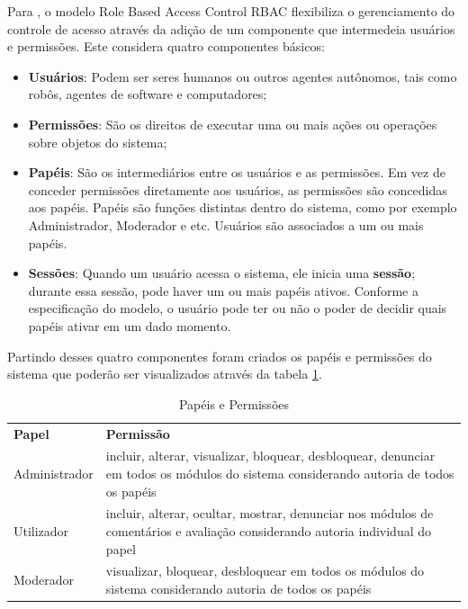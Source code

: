 \documentclass[12pt, a4paper]{report}
\begin{document}
Para \citep{sandhu1997}, o modelo Role Based Access Control \ac{RBAC} flexibiliza o gerenciamento do controle de acesso através da adição de um componente que intermedeia usuários e permissões. Este considera quatro componentes básicos:
\begin{itemize}
\item \textbf{Usuários}: Podem ser seres humanos ou outros agentes autônomos, tais como robôs, agentes de software e computadores;
\item \textbf{Permissões}: São os direitos de executar uma ou mais ações ou operações sobre objetos do sistema;
\item \textbf{Papéis}: São os intermediários entre os usuários e as permissões. Em vez de conceder permissões diretamente aos usuários, as permissões são concedidas aos papéis. Papéis são funções distintas dentro do sistema, como por exemplo Administrador, Moderador e etc. Usuários são associados a um ou mais papéis.  
\item \textbf{Sessões}: Quando um usuário acessa o sistema, ele inicia uma \textbf{sessão}; durante  essa  sessão, pode haver  um  ou  mais  papéis ativos. Conforme a especificação do modelo, o usuário pode ter ou não o poder de decidir quais papéis ativar em um dado momento.
\end{itemize}

Partindo desses quatro componentes foram criados os papéis e permissões do sistema que poderão ser visualizados através da tabela \ref{tab:papelperm}.

\begin{table}
 \centering
 {\renewcommand\arraystretch{1.25}
 \begin{tabular}{ l l }
  \cline{1-1}\cline{2-2}  
    \multicolumn{1}{|p{4cm}|}{\textbf{Papel} \centering } &
    \multicolumn{1}{p{6cm}|}{\textbf{Permissão} \centering }
  \\  
  \cline{1-1}\cline{2-2}  
    \multicolumn{1}{|p{4cm}|}{Administrador} &
    \multicolumn{1}{p{6cm}|}{incluir, alterar, visualizar, bloquear, desbloquear, denunciar em todos os módulos do sistema considerando autoria de todos os papéis}
  \\  
  \cline{1-1}\cline{2-2}  
    \multicolumn{1}{|p{4cm}|}{Utilizador} &
    \multicolumn{1}{p{6cm}|}{incluir, alterar, ocultar, mostrar, denunciar nos módulos de comentários e avaliação considerando autoria individual do papel}
    \\
      \cline{1-1}\cline{2-2}  
        \multicolumn{1}{|p{4cm}|}{Moderador} &
        \multicolumn{1}{p{6cm}|}{visualizar, bloquear, desbloquear em todos os módulos do sistema considerando autoria de todos os papéis}
  \\
  \hline
 \end{tabular} }
 \caption{Papéis e Permissões}
  \label{tab:papelperm}
\end{table}
\end{document}
